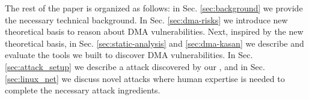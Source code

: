 The rest of the paper is organized as follows:
in Sec. \ref{sec:background} we provide the necessary technical background. 
In Sec. \ref{sec:dma-risks} we introduce new theoretical basis to reason about DMA vulnerabilities.
Next, inspired by the new theoretical basis, in Sec. \ref{sec:static-analysis} and \ref{sec:dma-kasan} we describe and evaluate the tools we built to discover DMA vulnerabilities. 
In Sec. \ref{sec:attack_setup} we describe a \simple attack discovered by our \tool, and in Sec. \ref{sec:linux_net} we discuss novel \compound attacks where human expertise is needed to complete the necessary attack ingredients.


